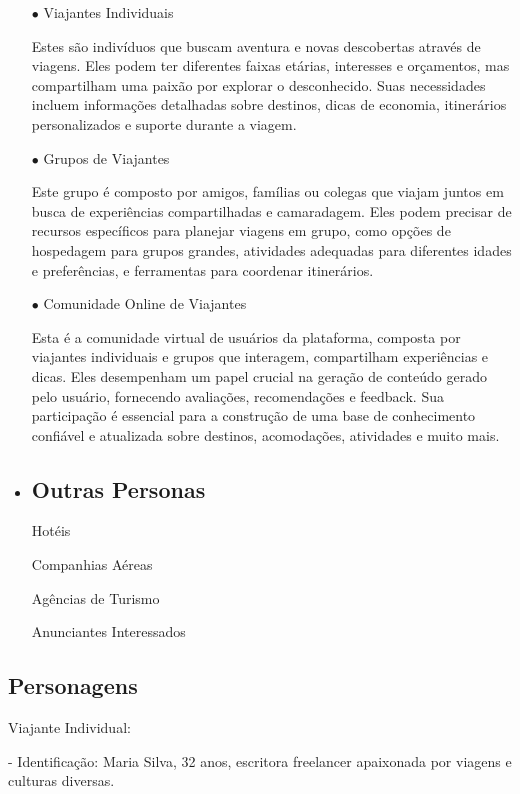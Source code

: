 \documentclass{article}
\begin{document}
\begin{itemize}
      \item[$\bullet$] Viajantes Individuais
      \item[] Estes são indivíduos que buscam aventura e novas descobertas através de viagens.
            Eles podem ter diferentes faixas etárias, interesses e orçamentos, mas compartilham uma paixão por explorar o desconhecido.
            Suas necessidades incluem informações detalhadas sobre destinos, dicas de economia, itinerários personalizados e suporte durante a viagem.
      \item[$\bullet$] Grupos de Viajantes
      \item[] Este grupo é composto por amigos, famílias ou colegas que viajam juntos em busca de experiências compartilhadas e camaradagem.
            Eles podem precisar de recursos específicos para planejar viagens em grupo, como opções de hospedagem para grupos grandes, atividades adequadas para diferentes idades e preferências, e ferramentas para coordenar itinerários.
      \item[$\bullet$] Comunidade Online de Viajantes
      \item[] Esta é a comunidade virtual de usuários da plataforma, composta por viajantes individuais e grupos que interagem, compartilham experiências e dicas.
            Eles desempenham um papel crucial na geração de conteúdo gerado pelo usuário, fornecendo avaliações, recomendações e feedback.
            Sua participação é essencial para a construção de uma base de conhecimento confiável e atualizada sobre destinos, acomodações, atividades e muito mais.
      \item {\subsection {Outras Personas}}
      \item[] Hotéis
      \item[] Companhias Aéreas
      \item[] Agências de Turismo
      \item[] Anunciantes Interessados
\end{itemize}
{\subsection{Personagens}}
Viajante Individual:

- Identificação: Maria Silva, 32 anos, escritora freelancer apaixonada por viagens e culturas diversas.
\end{document}
